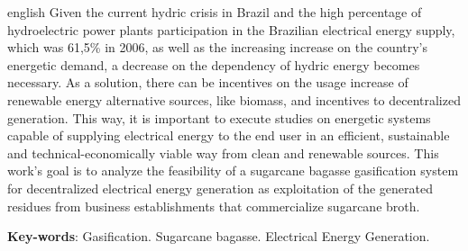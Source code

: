 \begin{resumo}[Abstract]
 \begin{otherlanguage*}{english}
Given the current hydric crisis in Brazil and the high percentage of hydroelectric power plants participation in the Brazilian electrical energy supply, which was 61,5\% in 2006, as well as the increasing increase on the country’s energetic demand, a decrease on the dependency of hydric energy becomes necessary. As a solution, there can be incentives on the usage increase of renewable energy alternative sources, like biomass, and incentives to decentralized generation. This way, it is important to execute studies on energetic systems capable of supplying electrical energy to the end user in an efficient, sustainable and technical-economically viable way from clean and renewable sources. This work’s goal is to analyze the feasibility of a sugarcane bagasse gasification system for decentralized electrical energy generation as exploitation of the generated residues from business establishments that commercialize sugarcane broth.

   \vspace{\onelineskip}
 
   \noindent 
   \textbf{Key-words}: Gasification. Sugarcane bagasse. Electrical Energy Generation.
 \end{otherlanguage*}
\end{resumo}
